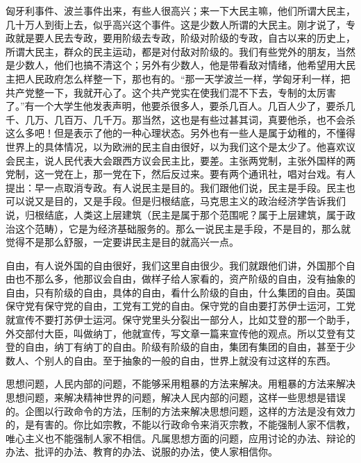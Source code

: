 匈牙利事件、波兰事件出来，有些人很高兴；来一下大民主嘛，他们所谓大民主，几十万人到街上去，似乎高兴这个事件。这是少数人所谓的大民主。刚才说了，专政就是要人民去专政，要用阶级去专政，阶级对阶级的专政，自古以来的历史上，所谓大民主，群众的民主运动，都是对付敌对阶级的。我们有些党外的朋友，当然是少数人，他们也搞不清这个；另外有少数人，他是带看敌对情绪，他希望用大民主把人民政府怎么样整一下，那也有的。“那一天学波兰一样，学匈牙利一样，把共产党整一下，我就开心了。这个共产党实在使我们混不下去，专制的太厉害了。”有一个大学生他发表声明，他要杀很多人，要杀几百人。几百人少了，要杀几千、几万、几百万、几千万。那当然，这也是有些过甚其词，真要他杀，也不会杀这么多吧！但是表示了他的一种心理状态。另外也有一些人是属于幼稚的，不懂得世界上的具体情况，以为欧洲的民主自由很好，以为我们这个是太少了。他喜欢议会民主，说人民代表大会跟西方议会民主比，要差。主张两党制，主张外国样的两党制，这一党在上，那一党在下，然后反过来。要有两个通讯社，唱对台戏。有人提出：早一点取消专政。有人说民主是目的。我们跟他们说，民主是手段。民主也可以说又是目的，又是手段。但是归根结底，马克思主义的政治经济学告诉我们说，归根结底，人类这上层建筑（民主是属于那个范围呢？属于上层建筑，属于政治这个范畴），它是为经济基础服务的。那么一说民主是手段，不是目的，那么就觉得不是那么舒服，一定要讲民主是目的就高兴一点。

自由，有人说外国的自由很好，我们这里自由很少。我们就跟他们讲，外国那个自由也不那么多，他那议会自由，做样子给人家看的，资产阶级的自由，没有抽象的自由，只有阶级的自由，具体的自由，看什么阶级的自由，什么集团的自由。英国保守党有保守党的自由，工党有工党的自由。保守党的自由要打苏伊士运河，工党就宣传不要打苏伊士运河。保守党里头分裂出一部分人，比如艾登的那一个助手，外交部付大臣，叫做纳丁，他就宣传，写文章一篇来宣传他的观点。所以艾登有艾登的自由，纳丁有纳丁的自由。阶级有阶级的自由，集团有集团的自由，甚至于少数人、个别人的自由。至于抽象的一般的自由，世界上就没有过这样的东西。

思想问题，人民内部的问题，不能够采用粗暴的方法来解决。用粗暴的方法来解决思想问题，来解决精神世界的问题，解决人民内部的问题，这样一些思想是错误的。企图以行政命令的方法，压制的方法来解决思想问题，这样的方法是没有效力的，是有害的。你比如宗教，不能以行政命令来消灭宗教，不能强制人家不信教，唯心主义也不能强制人家不相信。凡属思想方面的问题，应用讨论的办法、辩论的办法、批评的办法、教育的办法、说服的办法，使人家相信你。

